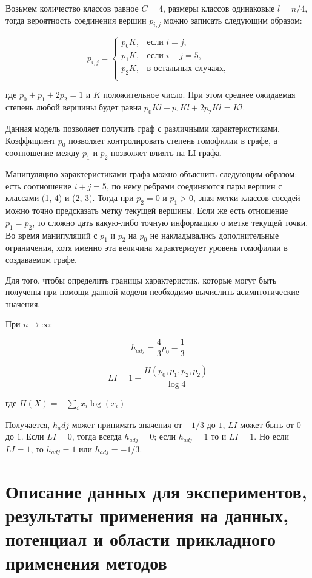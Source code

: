 \documentclass[a4paper,14pt]{article}
\begin{document}
	Возьмем  количество классов равное $C=4$, размеры классов одинаковые $l=n/4$, тогда вероятность соединения вершин $p_{i,j}$ можно записать следующим образом:
	
	$$p_{i,j} = \begin{cases}
		p_0K, & \text{если } i = j,\\
		p_1K, & \text{если } i + j = 5,\\
		p_2K, & \text{в остальных случаях},\\
	\end{cases}$$
	
	где $p_0+p_1+2p_2=1$ и $K$ положительное число.
	При этом среднее ожидаемая степень любой вершины будет равна $p_0 Kl+p_1 Kl+2p_2 Kl=Kl$.
	
	Данная модель позволяет получить граф с различными характеристиками.
	Коэффициент $p_0$ позволяет контролировать степень гомофилии в графе, а соотношение между $p_1$ и $p_2$ позволяет влиять на LI графа.
	
	Манипуляцию характеристиками графа можно объяснить следующим образом: есть соотношение $i+j=5$, по нему ребрами соединяются пары вершин с классами (1, 4) и (2, 3).
	Тогда при $p_2=0$ и $p_1>0$, зная метки классов соседей можно точно предсказать метку текущей вершины.
	Если же есть отношение $p_1=p_2$, то сложно дать какую-либо точную информацию о метке текущей точки.
	Во время манипуляций с $p_1$ и $p_2$  на $p_0$ не накладывались дополнительные ограничения, хотя именно эта величина характеризует уровень гомофилии в создаваемом графе.
	
	Для того, чтобы определить границы характеристик, которые могут быть получены при помощи данной модели необходимо вычислить асимптотические значения.
	
	При $n \rightarrow \infty$:
	
	$$h_{adj} = \dfrac{4}{3}p_0 - \dfrac{1}{3}$$
	
	$$LI = 1 - \dfrac{H(p_0,p_1,p_2,p_2)}{\log 4}$$
	
	где $H(X) = -\sum_ix_i\log(x_i)$
	
	Получается, $h_adj$ может принимать значения от $-1/3$ до $1$, $LI$ может быть от $0$ до $1$. Если $LI=0$, тогда всегда $h_{adj}=0$; если $h_{adj}=1$ то и $LI=1$.
	Но если $LI=1$, то $h_{adj}=1$ или $h_{adj}=-1/3$.
	
	\pagebreak
	\section{Описание данных для экспериментов, результаты применения на данных, потенциал и области прикладного применения методов}
	\setcounter{figure}{0}
	
\end{document}
